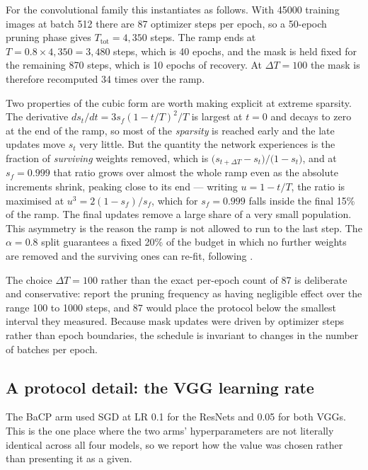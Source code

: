 For the convolutional family this instantiates as follows. With \num{45000}
training images at batch 512 there are 87 optimizer steps per epoch, so a
50-epoch pruning phase gives $T_{\mathrm{tot}} = 4{,}350$ steps. The ramp ends at
$T = 0.8 \times 4{,}350 = 3{,}480$ steps, which is 40 epochs, and the mask is held
fixed for the remaining 870 steps, which is 10 epochs of recovery. At
$\Delta T = 100$ the mask is therefore recomputed 34 times over the ramp.

Two properties of the cubic form are worth making explicit at extreme sparsity.
The derivative $ds_t/dt = 3 s_f (1 - t/T)^2 / T$ is largest at $t = 0$ and decays
to zero at the end of the ramp, so most of the \emph{sparsity} is reached early
and the late updates move $s_t$ very little. But the quantity the network
experiences is the fraction of \emph{surviving} weights removed, which is
$\big(s_{t+\Delta T} - s_t\big) / \big(1 - s_t\big)$, and at $s_f = 0.999$ that
ratio grows over almost the whole ramp even as the absolute increments shrink,
peaking close to its end --- writing $u = 1 - t/T$, the ratio is maximised at
$u^3 = 2(1 - s_f)/s_f$, which for $s_f = 0.999$ falls inside the final 15\% of
the ramp. The final updates remove a large share of a very small population. This
asymmetry is the reason the ramp is not allowed to run to the last step. The
$\alpha = 0.8$ split guarantees a fixed 20\% of the budget in which no further
weights are removed and the surviving ones can re-fit, following
\citet{gale2019state}.

The choice $\Delta T = 100$ rather than the exact per-epoch count of 87 is
deliberate and conservative: \citet{zhu2018prune} report the pruning frequency as
having negligible effect over the range 100 to 1000 steps, and 87 would place the
protocol below the smallest interval they measured. Because mask updates were
driven by optimizer steps rather than epoch boundaries, the schedule is invariant
to changes in the number of batches per epoch.

\subsection{A protocol detail: the VGG learning rate}
\label{sec:app:vgglr}

The BaCP arm used SGD at LR 0.1 for the ResNets and 0.05 for both VGGs. This is
the one place where the two arms' hyperparameters are not literally identical
across all four models, so we report how the value was chosen rather than
presenting it as a given.

